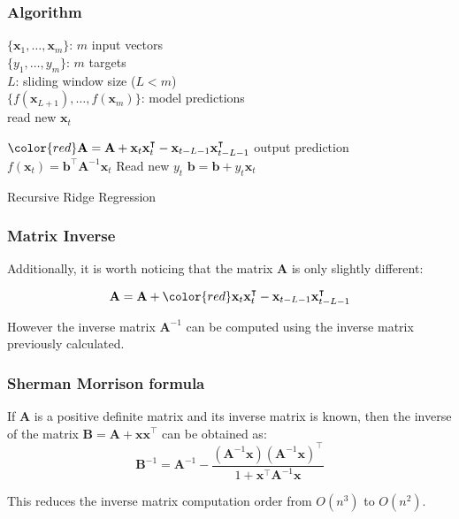\begin{frame}
     \frametitle{Algorithm} 

    \begin{algorithm}[H] \begin{algorithmic}[1] \REQUIRE $\,$ \\
    $\{\mathbf{x}_1,\dots,\mathbf{x}_m \}$: $m$ input vectors \\
    $\{y_1,\dots,y_m \}$: $m$ targets \\ $L$: sliding window size ($L<m$)
    \\ \ENSURE  $\,$ \\ $\{f(\mathbf{x}_{L+1}),\dots,f(\mathbf{x}_m) \}$:
    model predictions \\   \STATE read new $\mathbf{x}_t$ 
    
    \STATE $\color{red}\mathbf{A} =
    \mathbf{A} + \mathbf{x}_t \mathbf{x}_t^\intercal- \mathbf{x}_{t-L-1}
    \mathbf{x}_{t-L-1}^\intercal  $ \STATE output prediction
    $f(\mathbf{x}_t) =  \mathbf{b}^\intercal \mathbf{A}^{-1}\mathbf{x}_t$
    \STATE Read new $y_t$ \STATE $\mathbf{b} = \mathbf{b} + y_t
    \mathbf{x}_t$ \ENDFOR

    \end{algorithmic} \caption{Recursive Ridge Regression}
    \label{alg:SLAAR} \end{algorithm}
\end{frame}


\begin{frame}
     \frametitle{Matrix Inverse} 
   Additionally, it is worth noticing that the matrix $\mathbf{A}$ is
   only slightly different:

   \begin{equation*}
        \mathbf{A} = \mathbf{A} + {\color{red}\mathbf{x}_t \mathbf{x}_t^\intercal -\mathbf{x}_{t-L-1}
       \mathbf{x}_{t-L-1}^\intercal}
   \end{equation*}

   However the inverse matrix $\mathbf{A}^{-1}$ can be computed using
   the inverse matrix previously calculated.
\end{frame}


\begin{frame}
     \frametitle{Sherman Morrison formula}
     \begin{theorem}
     If $\mathbf{A}$ is a positive definite matrix and its inverse
     matrix is known, then the inverse of the matrix
     $\mathbf{B}=\mathbf{A} + \mathbf{x}\mathbf{x}^\intercal$ can be
     obtained as:
     \begin{equation*}
         \mathbf{B}^{-1} = \mathbf{A}^{-1} - 
         \frac{(\mathbf{A}^{-1}\mathbf{x})(\mathbf{A}^{-1}\mathbf{x})^{\intercal}}
         {1 + \mathbf{x}^{\intercal} \mathbf{A}^{-1} \mathbf{x}}
     \end{equation*}
     \end{theorem}   
     This reduces the inverse matrix computation order from $O(n^3)$ to $O(n^2)$.
\end{frame}


